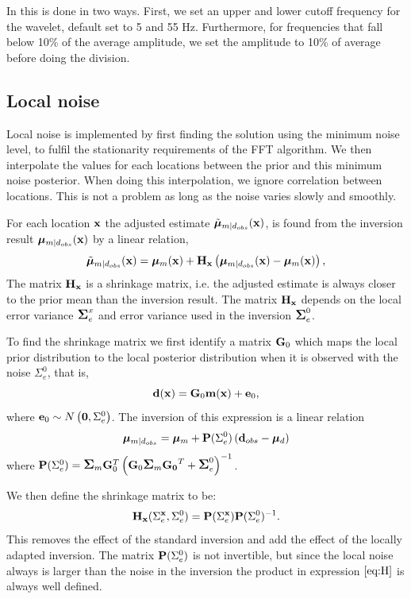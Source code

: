 In \crava this is done in two ways. First, we set an upper and lower
cutoff frequency for the wavelet, default set to 5 and 55
Hz. Furthermore, for frequencies that fall below 10\% of the average
amplitude, we set the amplitude to 10\% of average before doing the
division.

\subsection{Local noise}
\label{sec:localnoiseimp}
Local noise is implemented by first finding the solution using the
minimum noise level, to fulfil the stationarity requirements of the
FFT algorithm. We then interpolate the values for each locations
between the prior and this minimum noise posterior. When doing this
interpolation, we ignore correlation between locations. This is not a
problem as long as the noise varies slowly and smoothly.


For each location $\mathbf{x}$ the adjusted estimate $\tilde{\bm\mu}_{m|d_{obs}}(\mathbf{x})$, is found
from the inversion result $\bm\mu_{m|d_{obs}}(\mathbf{x})$ by a linear relation,
\begin{equation} \label{eq:LocalAdjustment}
\tilde{\bm\mu}_{m|d_{obs}}(\mathbf{x}) = \bm\mu_{m}(\mathbf{x}) +\mathbf{H_x}\left(\bm\mu_{m|d_{obs}}(\mathbf{x})-\bm\mu_{m}(\mathbf{x})\right),
\end{equation}
The matrix $\mathbf{H_x}$ is a shrinkage matrix, i.e. the adjusted estimate
is always closer to the prior mean than the inversion result. The matrix
$\mathbf{H_x}$ depends on the local error variance
 $\mbox{\large\ensuremath{\boldsymbol{\Sigma}}}_{e}^x$ and error variance used in the inversion $\mbox{\large\ensuremath{\boldsymbol{\Sigma}}}_{e}^0$.

To find the shrinkage matrix we first identify a matrix $\mathbf{G}_0$
which maps the local prior distribution to the local posterior
distribution when it is observed with the noise $\Sigma_{e}^0$, that is,
$$ \mathbf{d}(\mathbf{x}) = \mathbf{G}_0\mathbf{m}(\mathbf{x})+\mathbf{e}_0,$$
where $\mathbf{e}_0\sim N\left( \mathbf{0},\Sigma_{e}^0\right)$.
The inversion of this expression is a linear relation
 \begin{equation} \label{eq:PSigmae}
\bm\mu_{m|d_{obs}} =\bm\mu_{m} +\mathbf{P}(\Sigma_{e}^0)\left(\mathbf{d}_{obs}-\bm\mu_{d}\right)
\end{equation}
where  $\mathbf{P}(\Sigma_{e}^0)=\mbox{\large\ensuremath{\boldsymbol{\Sigma}}}_{m}\mathbf{G}_0^T \left( \mathbf{G}_0\mbox{\large\ensuremath{\boldsymbol{\Sigma}}}_{m}\mathbf{G_0}^T+\mbox{\large\ensuremath{\boldsymbol{\Sigma}}}_{e}^0\right)^{-1}$.

We then define the shrinkage matrix to be:
\begin{equation}\label{eq:H}
\mathbf{H_x}(\Sigma_{e}^{\mathbf{x}},\Sigma_{e}^0) = \mathbf{P}(\Sigma_{e}^{\mathbf{x}})\mathbf{P}(\Sigma_{e}^0)^{-1}.
\end{equation}
This removes the effect of the standard inversion and add the effect
of the locally adapted inversion. The matrix $\mathbf{P}(\Sigma_{e}^0)$
is not invertible, but since the local noise always is larger than the
noise in the inversion the product in expression $\ref{eq:H}$ is
always well defined.

